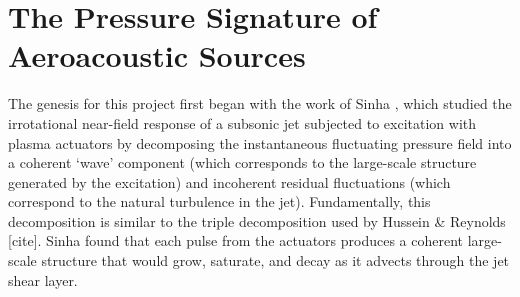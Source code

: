 \chapter{The Pressure Signature of Aeroacoustic Sources}
The genesis for this project first began with the work of Sinha \etal [cite], which studied the irrotational near-field response of a subsonic jet subjected to excitation with plasma actuators by decomposing the instantaneous fluctuating pressure field into a coherent `wave' component (which corresponds to the large-scale structure generated by the excitation) and incoherent residual fluctuations (which correspond to the natural turbulence in the jet). 
Fundamentally, this decomposition is similar to the triple decomposition used by Hussein \& Reynolds [cite].
Sinha \etal [cite] found that each pulse from the actuators produces a coherent large-scale structure that would grow, saturate, and decay as it advects through the jet shear layer. 

